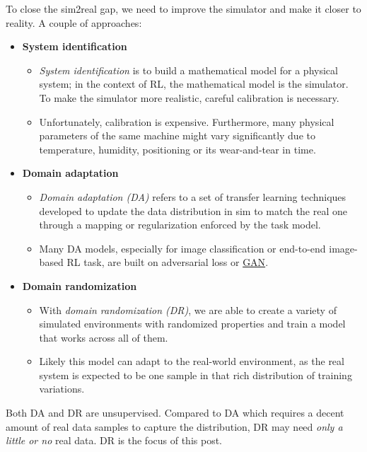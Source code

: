 To close the sim2real gap, we need to improve the simulator and make it closer to reality. A couple of approaches:

\begin{itemize}
\tightlist
\item
  \textbf{System identification}

  \begin{itemize}
  \tightlist
  \item
    \emph{System identification} is to build a mathematical model for a physical system; in the context of RL, the mathematical model is the simulator. To make the simulator more realistic, careful calibration is necessary.
  \item
    Unfortunately, calibration is expensive. Furthermore, many physical parameters of the same machine might vary significantly due to temperature, humidity, positioning or its wear-and-tear in time.
  \end{itemize}
\item
  \textbf{Domain adaptation}

  \begin{itemize}
  \tightlist
  \item
    \emph{Domain adaptation (DA)} refers to a set of transfer learning techniques developed to update the data distribution in sim to match the real one through a mapping or regularization enforced by the task model.
  \item
    Many DA models, especially for image classification or end-to-end image-based RL task, are built on adversarial loss or \href{https://lilianweng.github.io/posts/2017-08-20-gan/}{GAN}.
  \end{itemize}
\item
  \textbf{Domain randomization}

  \begin{itemize}
  \tightlist
  \item
    With \emph{domain randomization (DR)}, we are able to create a variety of simulated environments with randomized properties and train a model that works across all of them.
  \item
    Likely this model can adapt to the real-world environment, as the real system is expected to be one sample in that rich distribution of training variations.
  \end{itemize}
\end{itemize}

Both DA and DR are unsupervised. Compared to DA which requires a decent amount of real data samples to capture the distribution, DR may need \emph{only a little or no} real data. DR is the focus of this post.

